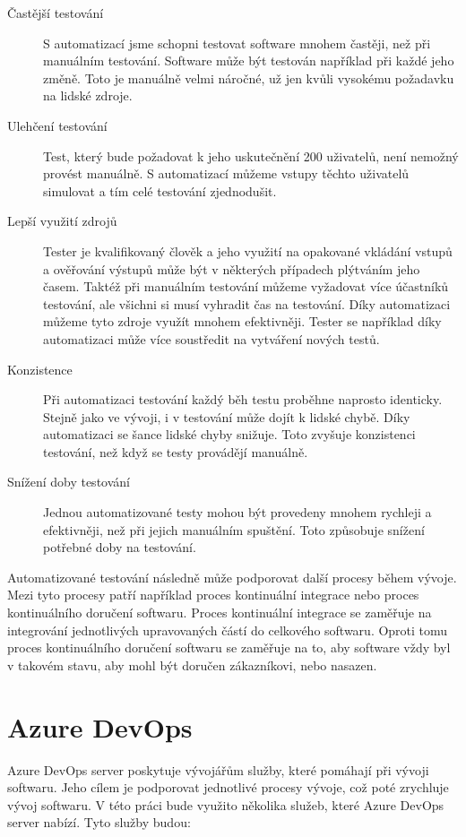 \begin{description}
    \item[Častější testování] S automatizací jsme schopni testovat software mnohem častěji, než při manuálním testování. Software může být testován například při každé jeho změně. Toto je manuálně velmi náročné, už jen kvůli vysokému požadavku na lidské zdroje.  
    \item[Ulehčení testování] Test, který bude požadovat k jeho uskutečnění 200 uživatelů, není nemožný provést manuálně. S automatizací můžeme vstupy těchto uživatelů simulovat a tím celé testování zjednodušit.  
    \item[Lepší využití zdrojů] Tester je kvalifikovaný člověk a jeho využití na opakované vkládání vstupů a ověřování výstupů může být v některých případech plýtváním jeho časem.
    Taktéž při manuálním testování můžeme vyžadovat více účastníků testování, ale všichni si musí vyhradit čas na testování. Díky automatizaci můžeme tyto zdroje využít mnohem efektivněji. Tester se například díky automatizaci může více soustředit na vytváření nových testů.
    \item[Konzistence] Při automatizaci testování každý běh testu proběhne naprosto identicky. Stejně jako ve vývoji, i v testování může dojít k lidské chybě. Díky automatizaci se šance lidské chyby snižuje. Toto zvyšuje konzistenci testování, než když se testy provádějí manuálně.
    \item[Snížení doby testování] Jednou automatizované testy mohou být provedeny mnohem rychleji a efektivněji, než při jejich manuálním spuštění. Toto způsobuje snížení potřebné doby na testování.
\end{description}

Automatizované testování následně může podporovat další procesy během vývoje. Mezi tyto procesy patří například proces kontinuální integrace nebo proces kontinuálního doručení softwaru. Proces kontinuální integrace se zaměřuje na integrování jednotlivých upravovaných částí do celkového softwaru. Oproti tomu proces kontinuálního doručení softwaru se zaměřuje na to, aby software vždy byl v takovém stavu, aby mohl být doručen zákazníkovi, nebo nasazen. \cite{ci_cd}

\section{Azure DevOps}

Azure DevOps server poskytuje vývojářům služby, které pomáhají při vývoji softwaru. Jeho cílem je podporovat jednotlivé procesy vývoje, což poté zrychluje vývoj softwaru. \cite{azure_devops} V této práci bude využito několika služeb, které Azure DevOps server nabízí. Tyto služby budou:

